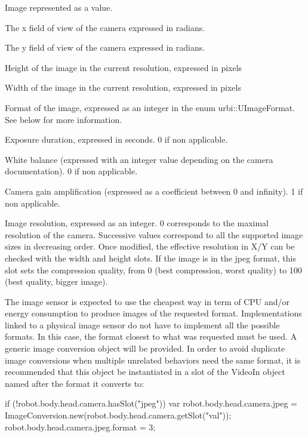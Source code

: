 \begin{slots}
  {%
    Image represented as a  value. %
  }

  {%
    The x field of view of the camera expressed in radians.%
  }

  {%
    The y field of view of the camera expressed in radians.%
  }

  {%
    Height of the image in the current resolution, expressed in
    pixels%
  }

  {%
    Width of the image in the current resolution, expressed in pixels%
  }

  {%
    Format of the image, expressed as an integer in the enum urbi::UImageFormat.
    See below for more information.%
  }

  {%
    Exposure duration, expressed in seconds. 0 if non applicable.%
  }

  {%
    White balance (expressed with an integer value depending on the
    camera documentation). 0 if non applicable.%
  }

  {%
    Camera gain amplification (expressed as a coefficient between 0
    and infinity). 1 if non applicable.%
  }

  {%
    Image resolution, expressed as an integer. 0 corresponds to the
    maximal resolution of the camera. Successive values correspond to
    all the supported image sizes in decreasing order.
    Once modified, the effective resolution in X/Y can be checked with
    the width and height slots.%
  }
  {%
    If the image is in the jpeg format, this slot sets the compression quality,
    from 0 (best compression, worst quality) to 100 (best quality, bigger
    image).%
  }

\end{slots}

The image sensor is expected to use the cheapest way in term of CPU and/or
energy consumption to produce images of the requested format.
Implementations linked to a physical image sensor do not have to implement
all the possible formats. In this case, the format closest to what was
requested must be used.
A generic image conversion object will be provided. In order to avoid
duplicate image conversions when multiple unrelated behaviors need the same
format, it is recommended that this object be instantiated in a slot of the
VideoIn object named after the format it converts to:
\begin{urbiunchecked}
if (!robot.body.head.camera.hasSlot("jpeg"))
{
  var robot.body.head.camera.jpeg =
    ImageConversion.new(robot.body.head.camera.getSlot("val"));
  robot.body.head.camera.jpeg.format = 3;
}
\end{urbiunchecked}

